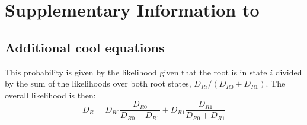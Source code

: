 \chapter{Supplementary Information to }%

\section{Additional cool equations}
\label{sec:root-state-calc}
 
This probability is given by the likelihood given that the root is in state
$i$ divided by the sum of the likelihoods over both root states,
$D_{Ri}/(D_{R0}+D_{R1})$.  The overall likelihood is then:
\begin{equation}
  \label{eq:root}
  D_{R} = D_{R0}\frac{D_{R0}}{D_{R0} + D_{R1}} +
  D_{R1}\frac{D_{R1}}{D_{R0} + D_{R1}}
\end{equation}

